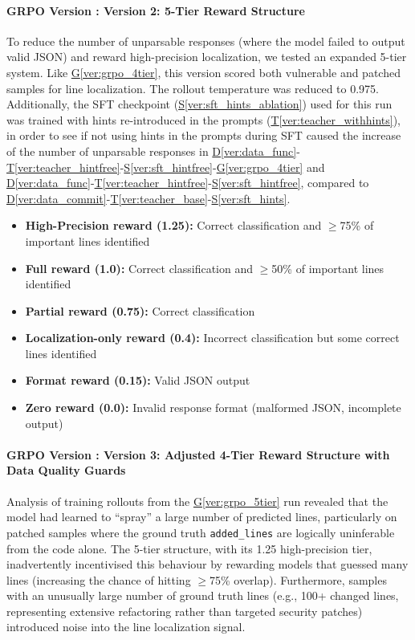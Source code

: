\documentclass[12pt,a4paper]{article}
\makeatletter
\newcounter{GRPOVer}
\newcommand{\grpoversion}[2]{%
  \stepcounter{GRPOVer}%
  \paragraph{GRPO Version \theGRPOVer: #1}%
  \protected@edef\@currentlabel{\theGRPOVer}\label{#2}%
}
\newcommand{\vcode}[4]{\hyperref[#1]{D\ref*{#1}}-\hyperref[#2]{T\ref*{#2}}-\hyperref[#3]{S\ref*{#3}}-\hyperref[#4]{G\ref*{#4}}}
\newcommand{\vcodeSFT}[3]{\hyperref[#1]{D\ref*{#1}}-\hyperref[#2]{T\ref*{#2}}-\hyperref[#3]{S\ref*{#3}}}
\makeatother
\begin{document}
\grpoversion{Version 2: 5-Tier Reward Structure}{ver:grpo_5tier}
To reduce the number of unparsable responses (where the model failed to output valid JSON) and reward high-precision localization, we tested an expanded 5-tier system. Like \hyperref[ver:grpo_4tier]{G\ref*{ver:grpo_4tier}}, this version scored both vulnerable and patched samples for line localization. The rollout temperature was reduced to 0.975. Additionally, the SFT checkpoint (\hyperref[ver:sft_hints_ablation]{S\ref*{ver:sft_hints_ablation}}) used for this run was trained with hints re-introduced in the prompts (\hyperref[ver:teacher_withhints]{T\ref*{ver:teacher_withhints}}), in order to see if not using hints in the prompts during SFT caused the increase of the number of unparsable responses in \vcode{ver:data_func}{ver:teacher_hintfree}{ver:sft_hintfree}{ver:grpo_4tier} and \vcodeSFT{ver:data_func}{ver:teacher_hintfree}{ver:sft_hintfree}, compared to \vcodeSFT{ver:data_commit}{ver:teacher_base}{ver:sft_hints}.
\begin{itemize}
\item \textbf{High-Precision reward (1.25):} Correct classification and $\geq$75\% of important lines identified
\item \textbf{Full reward (1.0):} Correct classification and $\geq$50\% of important lines identified
\item \textbf{Partial reward (0.75):} Correct classification
\item \textbf{Localization-only reward (0.4):} Incorrect classification but some correct lines identified
\item \textbf{Format reward (0.15):} Valid JSON output
\item \textbf{Zero reward (0.0):} Invalid response format (malformed JSON, incomplete output)
\end{itemize}

\grpoversion{Version 3: Adjusted 4-Tier Reward Structure with Data Quality Guards}{ver:grpo_4tier_improved}


Analysis of training rollouts from the \hyperref[ver:grpo_5tier]{G\ref*{ver:grpo_5tier}} run revealed that the model had learned to ``spray'' a large number of predicted lines, particularly on patched samples where the ground truth \texttt{added\_lines} are logically uninferable from the code alone. The 5-tier structure, with its 1.25 high-precision tier, inadvertently incentivised this behaviour by rewarding models that guessed many lines (increasing the chance of hitting $\geq$75\% overlap). Furthermore, samples with an unusually large number of ground truth lines (e.g., 100+ changed lines, representing extensive refactoring rather than targeted security patches) introduced noise into the line localization signal.
\end{document}
